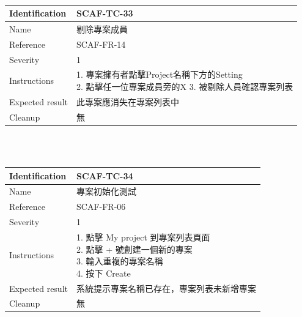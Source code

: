 \documentclass{report}
\begin{document}
\\
\begin{tabularx}{\textwidth}{
  |p{}%
  |p{}|%
  }
  \hline
  \centering Identification &  SCAF-TC-33 \\
  \hline
  \centering Name & 剔除專案成員 \\
  \hline
  \centering Reference & SCAF-FR-14 \\
  \hline
  \centering Severity & 1 \\
  \hline
  \centering Instructions & 
  \makecell[l]{
    1. 專案擁有者點擊Project名稱下方的Setting \\
    2. 點擊任一位專案成員旁的X
    3. 被剔除人員確認專案列表
  }\\
  \hline
  \centering Expected result & 此專案應消失在專案列表中 \\
  \hline
  \centering Cleanup & 無 \\
  \hline
\end{tabularx}
\\
\newline
\\
\begin{tabularx}{\textwidth}{
  |p{}%
  |p{}|%
  }
  \hline
  \centering Identification &  SCAF-TC-34 \\
  \hline
  \centering Name & 專案初始化測試 \\
  \hline
  \centering Reference & SCAF-FR-06 \\
  \hline
  \centering Severity & 1 \\
  \hline
  \centering Instructions & 
  \makecell[l]{
    1. 點擊 My project 到專案列表頁面 \\
    2. 點擊 + 號創建一個新的專案 \\
    3. 輸入重複的專案名稱 \\
    4. 按下 Create
  }\\
  \hline
  \centering Expected result & 系統提示專案名稱已存在，專案列表未新增專案 \\
  \hline
  \centering Cleanup & 無 \\
  \hline
\end{tabularx}
\\
\newline
\\
\end{document}
